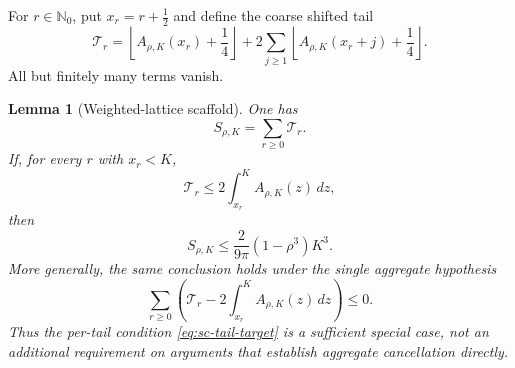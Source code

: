 \documentclass[11pt]{article}
\numberwithin{equation}{section}
\newtheorem{lemma}[theorem]{Lemma}
\theoremstyle{definition}
\theoremstyle{remark}
\begin{document}
For \(r\in\mathbb N_0\), put \(x_r=r+\tfrac12\) and define the coarse shifted
tail
\begin{equation}
  \mathcal T_r=
  \left\lfloor A_{\rho,K}(x_r)+\frac14\right\rfloor
  +2\sum_{j\ge1}
  \left\lfloor A_{\rho,K}(x_r+j)+\frac14\right\rfloor.
  \label{eq:sc-shifted-tail}
\end{equation}
All but finitely many terms vanish.

\begin{lemma}[Weighted-lattice scaffold]
\label{lem:sc-weighted-scaffold}
One has
\begin{equation}
  S_{\rho,K}=\sum_{r\ge0}\mathcal T_r.
  \label{eq:sc-tail-decomposition}
\end{equation}
If, for every \(r\) with \(x_r<K\),
\begin{equation}
  \mathcal T_r\le2\int_{x_r}^{K}A_{\rho,K}(z)\,dz,
  \label{eq:sc-tail-target}
\end{equation}
then
\begin{equation}
  S_{\rho,K}\le
  \frac{2}{9\pi}(1-\rho^3)K^3.
  \label{eq:sc-scaffold-conclusion}
\end{equation}
More generally, the same conclusion holds under the single aggregate
hypothesis
\begin{equation}
 \sum_{r\geq0}\left(
 \mathcal T_r-2\int_{x_r}^{K}A_{\rho,K}(z)\,dz
 \right)\leq0.
 \label{eq:sc-aggregate-tail-target}
\end{equation}
Thus the per-tail condition \eqref{eq:sc-tail-target} is a sufficient
special case, not an additional requirement on arguments that establish
aggregate cancellation directly.
\end{lemma}
\end{document}

